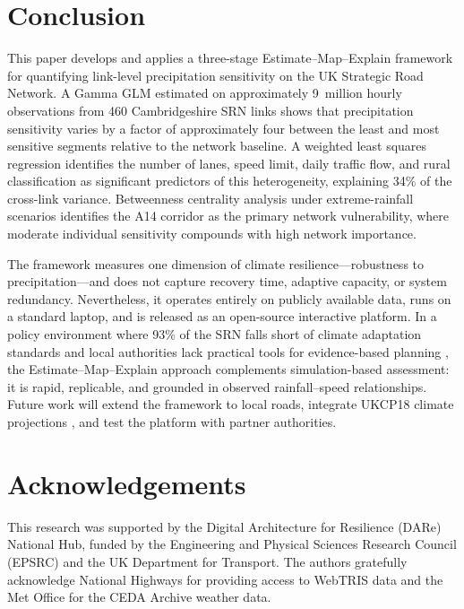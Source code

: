 \documentclass[review]{elsarticle}
\begin{document}
\section{Conclusion}
\label{sec:conclusion}

This paper develops and applies a three-stage Estimate--Map--Explain framework for quantifying link-level precipitation sensitivity on the UK Strategic Road Network. A Gamma GLM estimated on approximately 9~million hourly observations from 460 Cambridgeshire SRN links shows that precipitation sensitivity varies by a factor of approximately four between the least and most sensitive segments relative to the network baseline. A weighted least squares regression identifies the number of lanes, speed limit, daily traffic flow, and rural classification as significant predictors of this heterogeneity, explaining 34\% of the cross-link variance. Betweenness centrality analysis under extreme-rainfall scenarios identifies the A14 corridor as the primary network vulnerability, where moderate individual sensitivity compounds with high network importance.

The framework measures one dimension of climate resilience---robustness to precipitation---and does not capture recovery time, adaptive capacity, or system redundancy. Nevertheless, it operates entirely on publicly available data, runs on a standard laptop, and is released as an open-source interactive platform. In a policy environment where 93\% of the SRN falls short of climate adaptation standards \citep{nce2026srn} and local authorities lack practical tools for evidence-based planning \citep{dft2024rea}, the Estimate--Map--Explain approach complements simulation-based assessment: it is rapid, replicable, and grounded in observed rainfall--speed relationships. Future work will extend the framework to local roads, integrate UKCP18 climate projections \citep{ukcp18}, and test the platform with partner authorities.


\section*{Acknowledgements}

This research was supported by the Digital Architecture for Resilience (DARe) National Hub, funded by the Engineering and Physical Sciences Research Council (EPSRC) and the UK Department for Transport. The authors gratefully acknowledge National Highways for providing access to WebTRIS data and the Met Office for the CEDA Archive weather data.
\end{document}
